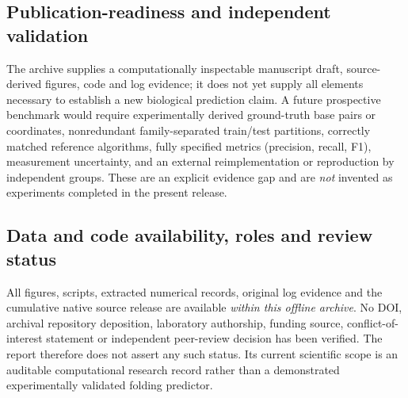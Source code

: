 \documentclass[11pt,a4paper]{article}
\begin{document}
\subsection{Publication-readiness and independent validation}
The archive supplies a computationally inspectable manuscript draft, source-derived figures, code and log evidence; it does not yet supply all elements necessary to establish a new biological prediction claim. A future prospective benchmark would require experimentally derived ground-truth base pairs or coordinates, nonredundant family-separated train/test partitions, correctly matched reference algorithms, fully specified metrics (precision, recall, F1), measurement uncertainty, and an external reimplementation or reproduction by independent groups. These are an explicit evidence gap and are \emph{not} invented as experiments completed in the present release.

\subsection{Data and code availability, roles and review status}
All figures, scripts, extracted numerical records, original log evidence and the cumulative native source release are available \emph{within this offline archive}. No DOI, archival repository deposition, laboratory authorship, funding source, conflict-of-interest statement or independent peer-review decision has been verified. The report therefore does not assert any such status. Its current scientific scope is an auditable computational research record rather than a demonstrated experimentally validated folding predictor.
\end{document}
